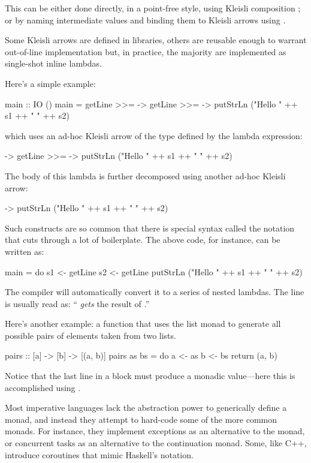 \documentclass[DaoFP]{subfiles}
\begin{document}
This can be either done directly, in a point-free style, using Kleisli composition \hask{<=<}; or by naming intermediate values and binding them to Kleisli arrows using \hask{>>=}. 

Some Kleisli arrows are defined in libraries, others are reusable enough to warrant out-of-line implementation but, in practice, the majority are implemented as single-shot inline lambdas.

Here's a simple example:
\begin{haskell}
main :: IO ()
main = 
  getLine >>=  ->
    getLine >>=  ->
      putStrLn ("Hello " ++ s1 ++ " " ++ s2)
\end{haskell}
which uses an ad-hoc Kleisli arrow of the type  defined by the lambda expression:
\begin{haskell}
 ->
    getLine >>=  ->
      putStrLn ("Hello " ++ s1 ++ " " ++ s2)
\end{haskell}
The body of this lambda is further decomposed using another ad-hoc Kleisli arrow:
\begin{haskell}
 -> putStrLn ("Hello " ++ s1 ++ " " ++ s2)
\end{haskell}

Such constructs are so common that there is special syntax called the  notation that cuts through a lot of boilerplate. The above code, for instance, can be written as:
\begin{haskell}
main = do
  s1 <- getLine
  s2 <- getLine
  putStrLn ("Hello " ++ s1 ++ " " ++ s2)
\end{haskell}
The compiler will automatically convert it to a series of nested lambdas. The line  is usually read as: `` \emph{gets} the result of .''

Here's another example: a function that uses the list monad to generate all possible pairs of elements taken from two lists.
\begin{haskell}
pairs :: [a] -> [b] -> [(a, b)]
pairs as bs = do
  a <- as
  b <- bs
  return (a, b)
\end{haskell}
Notice that the last line in a  block must produce a monadic value---here this is accomplished using .

Most imperative languages lack the abstraction power to generically define a monad, and instead they attempt to hard-code some of the more common monads. For instance, they implement exceptions as an alternative to the  monad, or concurrent tasks as an alternative to the continuation monad. Some, like C++, introduce coroutines that mimic Haskell's  notation. 
\end{document}

